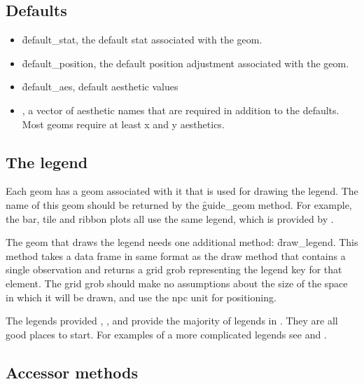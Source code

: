 \subsection{Defaults}
\label{sub:defaults}

\begin{itemize}
  \item \f{default_stat}, the default stat associated with the geom.
  
  \item \f{default_position}, the default position adjustment associated with the geom.

  \item \f{default_aes}, default aesthetic values
  
  \item {}, a vector of aesthetic names that are required in addition to the defaults.  Most geoms require at least x and y aesthetics.
  
\end{itemize}

\subsection{The legend}
\label{sub:the_legend}

Each geom has a geom associated with it that is used for drawing the legend.  The name of this geom should be returned by the \f{guide_geom} method.  For example, the bar, tile and ribbon plots all use the same legend, which is provided by .

The geom that draws the legend needs one additional method: \f{draw_legend}.  This method takes a data frame in same format as the draw method that contains a single observation and returns a grid grob representing the legend key for that element.  The grid grob should make no assumptions about the size of the space in which it will be drawn, and use the npc unit for positioning.

The legends provided , , and  provide the majority of legends in \ggplot.  They are all good places to start.  For examples of a more complicated legends see  and .

\subsection{Accessor methods}



